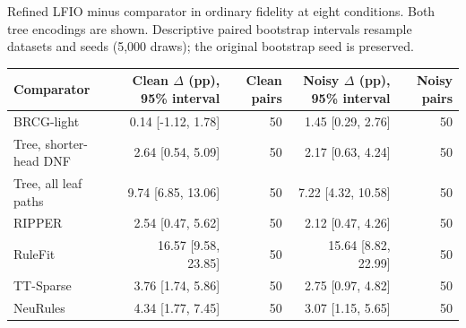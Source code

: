 \begin{kbtable}
\centering
\caption{Refined LFIO minus comparator in ordinary fidelity at eight conditions. Both tree encodings are shown. Descriptive paired bootstrap intervals resample datasets and seeds (5,000 draws); the original bootstrap seed is preserved.}
\label{tab:strength_paired}
\small
\begin{adjustbox}{max width=\linewidth}
\begin{tabular}{lrrrr}
\toprule
Comparator & Clean $\Delta$ (pp), 95\% interval & Clean pairs & Noisy $\Delta$ (pp), 95\% interval & Noisy pairs \\
\midrule
BRCG-light & 0.14 [-1.12, 1.78] & 50 & 1.45 [0.29, 2.76] & 50 \\
Tree, shorter-head DNF & 2.64 [0.54, 5.09] & 50 & 2.17 [0.63, 4.24] & 50 \\
Tree, all leaf paths & 9.74 [6.85, 13.06] & 50 & 7.22 [4.32, 10.58] & 50 \\
RIPPER & 2.54 [0.47, 5.62] & 50 & 2.12 [0.47, 4.26] & 50 \\
RuleFit & 16.57 [9.58, 23.85] & 50 & 15.64 [8.82, 22.99] & 50 \\
TT-Sparse & 3.76 [1.74, 5.86] & 50 & 2.75 [0.97, 4.82] & 50 \\
NeuRules & 4.34 [1.77, 7.45] & 50 & 3.07 [1.15, 5.65] & 50 \\
\bottomrule
\end{tabular}
\end{adjustbox}
\end{kbtable}
